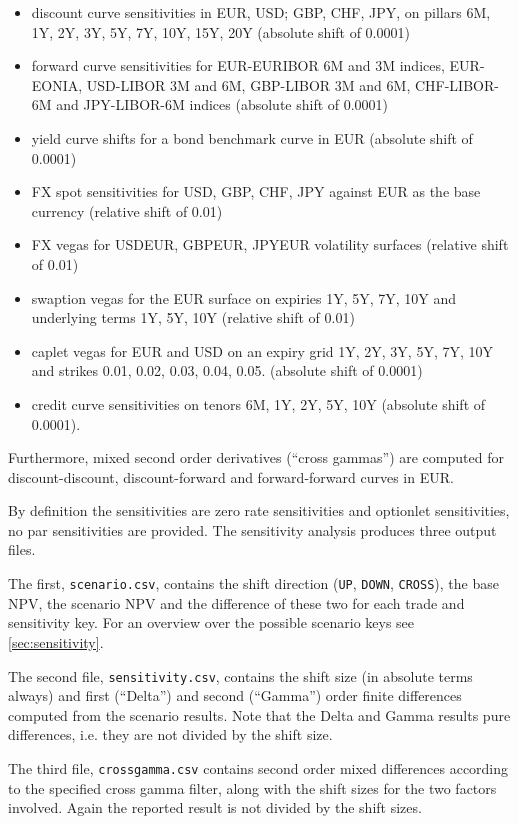 \documentclass[12pt, a4paper]{article}
\begin{document}
\begin{itemize}
\item discount curve sensitivities in EUR, USD; GBP, CHF, JPY, on pillars 6M, 1Y, 2Y, 3Y, 5Y, 7Y, 10Y, 15Y, 20Y (absolute shift of 0.0001)
\item forward curve sensitivities for EUR-EURIBOR 6M and 3M indices, EUR-EONIA, USD-LIBOR 3M and 6M, GBP-LIBOR 3M and
  6M, CHF-LIBOR-6M and JPY-LIBOR-6M indices (absolute shift of 0.0001)
\item yield curve shifts for a bond benchmark curve in EUR (absolute shift of 0.0001)
\item FX spot sensitivities for USD, GBP, CHF, JPY against EUR as the base currency (relative shift of 0.01)
\item FX vegas for USDEUR, GBPEUR, JPYEUR volatility surfaces (relative shift of 0.01)
\item swaption vegas for the EUR surface on expiries 1Y, 5Y, 7Y, 10Y and underlying terms 1Y, 5Y, 10Y (relative shift of 0.01)
\item caplet vegas for EUR and USD on an expiry grid 1Y, 2Y, 3Y, 5Y, 7Y, 10Y and strikes 0.01, 0.02, 0.03, 0.04,
  0.05. (absolute shift of 0.0001)
\item credit curve sensitivities on tenors 6M, 1Y, 2Y, 5Y, 10Y (absolute shift of 0.0001).
\end{itemize}

Furthermore, mixed second order derivatives (``cross gammas'') are computed for discount-discount, discount-forward and
forward-forward curves in EUR.

By definition the sensitivities are zero rate sensitivities and optionlet sensitivities, no par sensitivities are
provided. The sensitivity analysis produces three output files.

The first, {\tt scenario.csv}, contains the shift
direction ({\tt UP}, {\tt DOWN}, {\tt CROSS}), the base NPV, the scenario NPV and the difference of these two for each
trade and sensitivity key. For an overview over the possible scenario keys see \ref{sec:sensitivity}.

The second file, {\tt sensitivity.csv}, contains the shift size (in absolute terms always) and first (``Delta'') and second
(``Gamma'') order finite differences computed from the scenario results. Note that the Delta and Gamma results pure
differences, i.e. they are not divided by the shift size.

The third file, {\tt crossgamma.csv} contains second order mixed differences according to the specified cross gamma
filter, along with the shift sizes for the two factors involved. Again the reported result is not divided by the shift
sizes.
\end{document}
